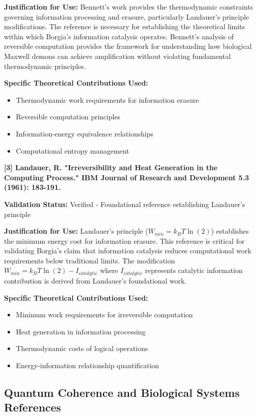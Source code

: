 \textbf{Justification for Use:} Bennett's work provides the thermodynamic constraints governing information processing and erasure, particularly Landauer's principle modifications. The reference is necessary for establishing the theoretical limits within which Borgia's information catalysis operates. Bennett's analysis of reversible computation provides the framework for understanding how biological Maxwell demons can achieve amplification without violating fundamental thermodynamic principles.

\textbf{Specific Theoretical Contributions Used:}
\begin{itemize}
\item Thermodynamic work requirements for information erasure
\item Reversible computation principles
\item Information-energy equivalence relationships
\item Computational entropy management
\end{itemize}

\textbf{[3] Landauer, R. "Irreversibility and Heat Generation in the Computing Process." IBM Journal of Research and Development 5.3 (1961): 183-191.}

\textbf{Validation Status:} Verified - Foundational reference establishing Landauer's principle

\textbf{Justification for Use:} Landauer's principle ($W_{min} = k_BT \ln(2)$) establishes the minimum energy cost for information erasure. This reference is critical for validating Borgia's claim that information catalysis reduces computational work requirements below traditional limits. The modification $W_{min} = k_BT \ln(2) - I_{catalytic}$ where $I_{catalytic}$ represents catalytic information contribution is derived from Landauer's foundational work.

\textbf{Specific Theoretical Contributions Used:}
\begin{itemize}
\item Minimum work requirements for irreversible computation
\item Heat generation in information processing
\item Thermodynamic costs of logical operations
\item Energy-information relationship quantification
\end{itemize}

\subsection{Quantum Coherence and Biological Systems References}


